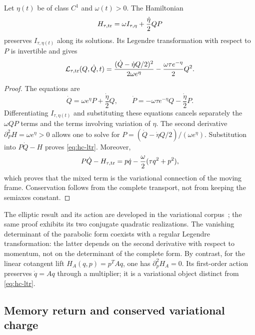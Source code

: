 \begin{theorem}
\label{thm:hc-legendre}
Let \(\eta(t)\) be of class \(C^1\) and \(\omega(t)>0\). The Hamiltonian
\begin{equation}
 H_{\tau,\rm tr}
 =\omega I_{\tau,\eta}+\frac{\dot\eta}{2}QP
 \label{eq:hc-htr}
\end{equation}
preserves \(I_{\tau,\eta(t)}\) along its solutions. Its
Legendre transformation with respect to \(P\) is invertible and gives
\begin{equation}
 \mathcal L_{\tau,\rm tr}(Q,\dot Q,t)
 =\frac{(\dot Q-\dot\eta Q/2)^2}{2\omega e^\eta}
 -\frac{\omega\tau e^{-\eta}}2Q^2.
 \label{eq:hc-ltr}
\end{equation}
\end{theorem}
\begin{proof}
The equations are
\[
 \dot Q=\omega e^\eta P+\frac{\dot\eta}2Q,
 \qquad
 \dot P=-\omega\tau e^{-\eta}Q-\frac{\dot\eta}2P.
\]
Differentiating \(I_{\tau,\eta(t)}\) and substituting these equations cancels separately
the \(\omega QP\) terms and the terms involving variation of \(\eta\).
The second derivative \(\partial_P^2H=\omega e^\eta>0\)
allows one to solve for
\(P=(\dot Q-\dot\eta Q/2)/(\omega e^\eta)\).
Substitution into \(P\dot Q-H\) proves \eqref{eq:hc-ltr}.
Moreover,
\[
 P\dot Q-H_{\tau,\rm tr}
 =p\dot q-\frac\omega2(\tau q^2+p^2),
\]
which proves that the mixed term is the variational connection of the moving
frame. Conservation follows from the complete transport, not from keeping
the semiaxes constant.
\end{proof}

The elliptic result and its action are developed in the variational
corpus~\cite{hmtX}; the same proof exhibits its two conjugate quadratic
realizations. The vanishing determinant of the parabolic form
coexists with a regular Legendre transformation: the latter depends on the
second derivative with respect to momentum, not on the determinant of the complete form.
By contrast, for the linear cotangent lift
\(H_A(q,p)=p^TAq\), one has \(\partial_p^2H_A=0\).
Its first-order action preserves \(\dot q=Aq\) through a
multiplier; it is a variational object distinct from
\eqref{eq:hc-ltr}.

\subsection{Memory return and conserved variational charge}

